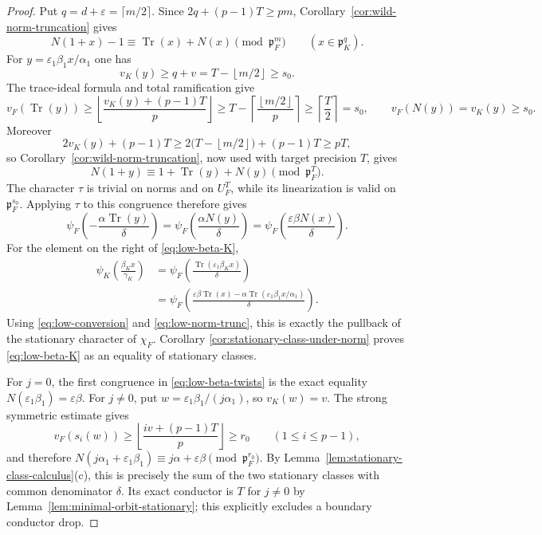 \documentclass[11pt]{amsart}
\theoremstyle{definition}
\theoremstyle{remark}
\newcommand{\p}{\mathfrak p}
\newcommand{\Tr}{\operatorname{Tr}}
\newcommand{\ceil}[1]{\left\lceil #1\right\rceil}
\newcommand{\floor}[1]{\left\lfloor #1\right\rfloor}
\begin{document}
\begin{proof}
Put $q=d+\varepsilon=\lceil m/2\rceil$.  Since
$2q+(p-1)T\ge pm$, Corollary~\ref{cor:wild-norm-truncation} gives
\begin{equation}\label{eq:low-norm-trunc}
 N(1+x)-1\equiv\Tr(x)+N(x)\pmod{\p_F^m}
 \qquad(x\in\p_K^q).
\end{equation}
For $y=\varepsilon_1\beta_1x/\alpha_1$ one has
\[
 v_K(y)\ge q+v=T-\floor{m/2}\ge s_0.
\]
The trace-ideal formula and total ramification give
\[
 v_F(\Tr(y))\ge
 \floor{\frac{v_K(y)+(p-1)T}{p}}
 \ge T-\ceil{\frac{\floor{m/2}}p}
 \ge\ceil{\frac T2}=s_0,
 \qquad v_F(N(y))=v_K(y)\ge s_0.
\]
Moreover
\[
 2v_K(y)+(p-1)T
 \ge2\bigl(T-\floor{m/2}\bigr)+(p-1)T
 \ge pT,
\]
so Corollary~\ref{cor:wild-norm-truncation}, now used with target
precision $T$, gives
\[
 N(1+y)\equiv1+\Tr(y)+N(y)\pmod{\p_F^T}.
\]
The character $\tau$ is trivial on norms and on $U_F^T$, while its
linearization is valid on $\p_F^{s_0}$.  Applying $\tau$ to this
congruence therefore gives
\begin{equation}\label{eq:low-conversion}
 \psi_F\!\left(-\frac{\alpha\Tr(y)}\delta\right)
 =\psi_F\!\left(\frac{\alpha N(y)}\delta\right)
 =\psi_F\!\left(\frac{\varepsilon\beta N(x)}\delta\right).
\end{equation}
For the element on the right of \eqref{eq:low-beta-K},
\begin{align*}
 \psi_K\!\left(\frac{\beta_Kx}{\gamma_K}\right)
 &=\psi_F\!\left(
   \frac{\Tr(\varepsilon_1\beta_Kx)}\delta\right)\\
 &=\psi_F\!\left(
   \frac{\varepsilon\beta\Tr(x)
         -\alpha\Tr(\varepsilon_1\beta_1x/\alpha_1)}\delta\right).
\end{align*}
Using \eqref{eq:low-conversion} and
\eqref{eq:low-norm-trunc}, this is exactly the pullback of the
stationary character of $\chi_F$.  Corollary
\ref{cor:stationary-class-under-norm} proves
\eqref{eq:low-beta-K} as an equality of stationary classes.

For $j=0$, the first congruence in
\eqref{eq:low-beta-twists} is the exact equality
$N(\varepsilon_1\beta_1)=\varepsilon\beta$.  For $j\ne0$, put
$w=\varepsilon_1\beta_1/(j\alpha_1)$, so $v_K(w)=v$.  The strong
symmetric estimate gives
\[
 v_F(s_i(w))\ge
 \left\lfloor\frac{iv+(p-1)T}{p}\right\rfloor\ge r_0
 \qquad(1\le i\le p-1),
\]
and therefore
$N(j\alpha_1+\varepsilon_1\beta_1)
 \equiv j\alpha+\varepsilon\beta\pmod{\p_F^{r_0}}$.
By Lemma~\ref{lem:stationary-class-calculus}(c), this is precisely the
sum of the two stationary classes with common denominator $\delta$.
Its exact conductor is $T$ for $j\ne0$ by
Lemma~\ref{lem:minimal-orbit-stationary}; this explicitly excludes a
boundary conductor drop.


\end{proof}
\end{document}
